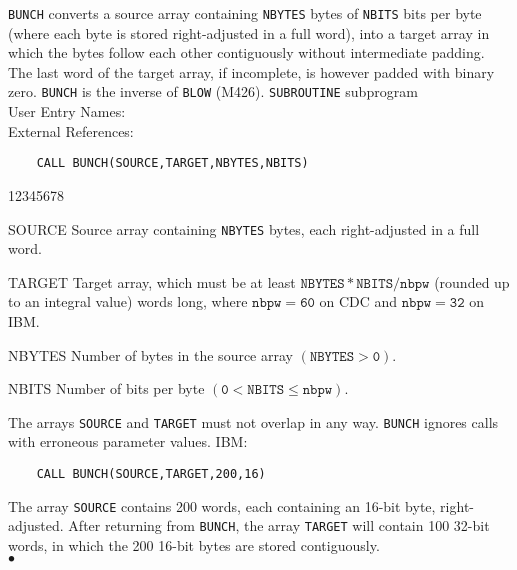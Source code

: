                          
      
\Submitter{}                                
  
{\tt BUNCH} converts a source array containing {\tt NBYTES} bytes of
{\tt NBITS} bits per byte (where each byte is stored right-adjusted in a
full word), into a target array in which the bytes follow each other
contiguously without intermediate padding. The last word of the target
array, if incomplete, is however padded with binary zero. {\tt BUNCH}
is the inverse of {\tt BLOW} (M426).
\Structure
{\tt SUBROUTINE} subprogram \\
User Entry Names:  \\
External References: \\
\Usage
\begin{verbatim}
    CALL BUNCH(SOURCE,TARGET,NBYTES,NBITS)
\end{verbatim}
\begin{DLtt}{12345678}
\item[SOURCE] Source array containing {\tt NBYTES} bytes, each
right-adjusted in a full word.
\item [TARGET] Target array, which must be at least
$\mathtt{NBYTES*NBITS/nbpw}$ (rounded up to an integral value) words
long, where $\mathtt{nbpw=60}$ on CDC and $\mathtt{nbpw=32}$ on IBM.
\item [NBYTES] Number of bytes in the source array $(\mathtt{NBYTES>0})$.
\item [NBITS] Number of bits per byte $\mathtt{(0 < NBITS \leq nbpw)}$.
\end{DLtt}
\Restrict
The arrays {\tt SOURCE} and {\tt TARGET} must not overlap in any way.
\Errorh
{\tt BUNCH} ignores calls with erroneous parameter values.
\Examples
IBM:
\begin{verbatim}
    CALL BUNCH(SOURCE,TARGET,200,16)
\end{verbatim}
The array {\tt SOURCE} contains 200 words, each containing an 16-bit
byte, right-adjusted. After returning from {\tt BUNCH}, the array
{\tt TARGET} will contain 100 32-bit words, in which the 200 16-bit
bytes are stored contiguously.
\\ $\bullet$
